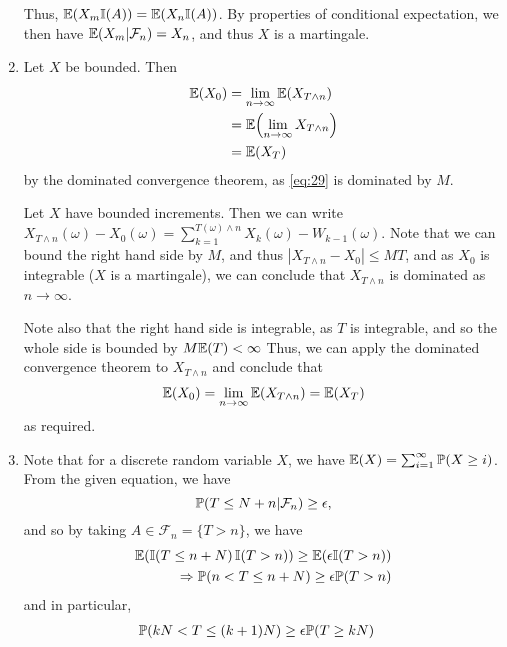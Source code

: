 \begin{enumerate}
  Thus, $\E{X_{m} \I{A}} = \E{X_{n} \I{A}}$.  By properties of
  conditional expectation, we then have $\E{X_{m} | \mathcal{F}_{n}} =
  X_{n}$, and thus $X$ is a martingale.
\item Let $X$ be bounded.  Then
  \begin{align}
    \label{eq:29}
    \E{X_{0}} &= \lim_{n \rightarrow \infty} \E{X_{T \wedge n}} \\
    &= \E{\lim_{n \rightarrow \infty} X_{T \wedge n}} \\
    &= \E{X_{T}}
  \end{align} by the dominated convergence theorem, as \eqref{eq:29}
  is dominated by $M$.

  Let $X$ have bounded increments. Then we can write $X_{T \wedge
    n}(\omega) - X_{0}(\omega) = \sum_{k=1}^{T(\omega) \wedge n}
  X_{k}(\omega) - W_{k-1}(\omega)$.  Note that we can bound the right
  hand side by $M$, and thus $|X_{T \wedge n} - X_{0}| \leq M T$, and
  as $X_{0}$ is integrable ($X$ is a martingale), we can conclude that
  $X_{T \wedge n}$ is dominated as $n \rightarrow \infty$.

  Note also that the right hand side is integrable, as $T$ is
  integrable, and so the whole side is bounded by $M \E{T} < \infty$
  Thus, we can apply the dominated convergence theorem to
  $X_{T \wedge n}$ and conclude that
  \begin{align}
    \label{eq:30}
    \E{X_{0}} = \lim_{n \rightarrow \infty} \E{X_{T \wedge n}} = \E{X_{T}}
  \end{align} as required.
\item Note that for a discrete random variable $X$, we have $\E{X} =
  \sum_{i=1}^{\infty} \Prob{X \geq  i}$. From the given equation, we
  have
  \begin{equation}
    \label{eq:36}
    \Prob{T \leq N + n | \mathcal{F}_{n}} \geq \epsilon,
  \end{equation} and so by taking $A \in \mathcal{F}_{n} = \{ T > n
  \}$, we have
  \begin{align}
    \label{eq:31}
    \E{\I{T \leq n + N} \I{T > n}} \geq \E{\epsilon \I{T > n}} \\
    \Rightarrow \Prob{n < T \leq n + N} \geq \epsilon \Prob{T > n}
  \end{align} and in particular,
  \begin{align}
    \label{eq:32}
    \Prob{kN < T \leq (k+1)N} &\geq \epsilon \Prob{T \geq kN}
  \end{align}


\end{enumerate}

